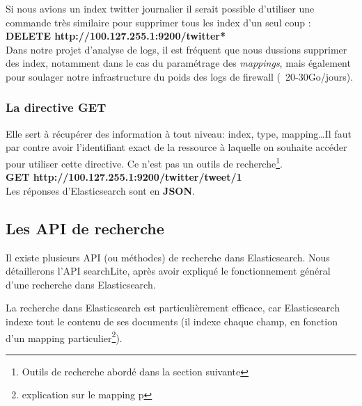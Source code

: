 {Si nous avions un index twitter journalier il serait possible d'utiliser une commande
très similaire pour supprimer tous les index d'un seul coup :\\
\textbf{DELETE  {\color{grey} http://100.127.255.1:9200}/{\color{red}twitter*}}\\

Dans notre projet d'analyse de logs, il est fréquent que nous dussions supprimer 
des index, notamment dans le cas du paramétrage des \emph{mappings}, mais également
pour soulager notre infrastructure du poids des logs de firewall (~20-30Go/jours).


\subsubsection{La directive \textbf{GET}} 
Elle sert à récupérer des information à tout niveau: index,
type, mapping\ldots Il faut par contre avoir l'identifiant exact de la ressource à laquelle on souhaite accéder pour utiliser cette directive.
Ce n'est pas un outils de recherche\footnote{Outils de recherche abordé dans la section suivante}.\\[2mm]
\textbf{GET  {\color{grey} http://100.127.255.1:9200}/{\color{red}twitter}/{\color{cyan}tweet}/{\color{yellow}1}}\\

Les réponses d'Elasticsearch sont en \textbf{JSON}. 


\subsection{Les API de recherche}

Il existe plusieurs API (ou méthodes) de recherche dans Elasticsearch. Nous détaillerons
l'API searchLite, après avoir expliqué le fonctionnement général 
d'une recherche dans Elasticsearch.

La recherche dans Elasticsearch est particulièrement efficace, car Elasticsearch 
indexe tout le contenu de ses documents (il indexe chaque champ, en fonction d'un
mapping particulier\footnote{explication sur le mapping p\pageref{sec:mappingetanalys}}).

}
